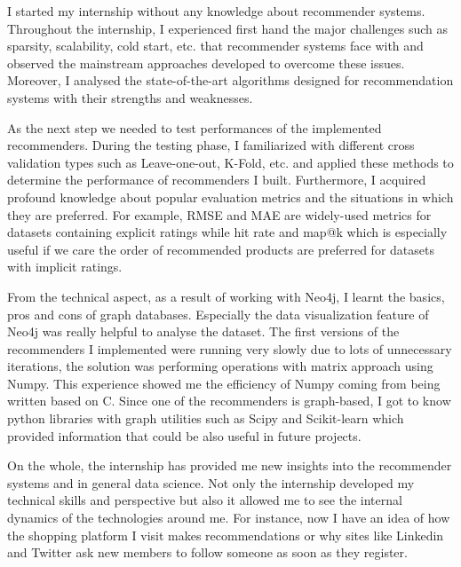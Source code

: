 I started my internship without any knowledge about recommender systems. Throughout the internship, I experienced first hand the major challenges such as sparsity, scalability, cold start, etc. that recommender systems face with and observed the mainstream approaches developed to overcome these issues. Moreover, I analysed the state-of-the-art algorithms designed for recommendation systems with their strengths and weaknesses.

As the next step we needed to test performances of the implemented recommenders. During the testing phase, I familiarized with different cross validation types such as Leave-one-out, K-Fold, etc. and applied these methods to determine the performance of recommenders I built. Furthermore, I acquired profound knowledge about popular evaluation metrics and the situations in which they are preferred. For example, RMSE and MAE are widely-used metrics for datasets containing explicit ratings while hit rate and map@k which is especially useful if we care the order of recommended products are preferred for datasets with implicit ratings. 

From the technical aspect, as a result of working with Neo4j, I learnt the basics, pros and cons of graph databases. Especially the data visualization feature of Neo4j was really helpful to analyse the dataset. The first versions of the recommenders I implemented were running very slowly due to lots of unnecessary iterations, the solution was performing operations with matrix approach using Numpy. This experience showed me the efficiency of Numpy coming from being written based on C. Since one of the recommenders is graph-based, I got to know python libraries with graph utilities such as Scipy and Scikit-learn which provided information that could be also useful in future projects.

On the whole, the internship has provided me new insights into the recommender systems and in general data science. Not only the internship developed my technical skills and perspective but also it allowed me to see the internal dynamics of the technologies around me.  For instance, now I have an idea of how the shopping platform I visit makes recommendations or why sites like Linkedin and Twitter ask new members to follow someone as soon as they register. \\